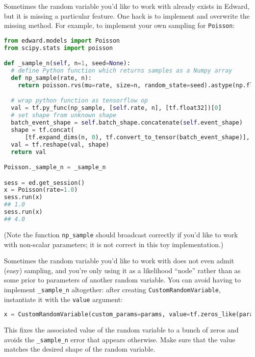 Sometimes the random variable you'd like to work with already exists
in Edward, but it is missing a particular feature. One hack is to
implement and overwrite the missing method. For example, to implement
your own sampling for \texttt{Poisson}:

\begin{lstlisting}[language=Python]
from edward.models import Poisson
from scipy.stats import poisson

def _sample_n(self, n=1, seed=None):
  # define Python function which returns samples as a Numpy array
  def np_sample(rate, n):
    return poisson.rvs(mu=rate, size=n, random_state=seed).astype(np.float32)

  # wrap python function as tensorflow op
  val = tf.py_func(np_sample, [self.rate, n], [tf.float32])[0]
  # set shape from unknown shape
  batch_event_shape = self.batch_shape.concatenate(self.event_shape)
  shape = tf.concat(
      [tf.expand_dims(n, 0), tf.convert_to_tensor(batch_event_shape)], 0)
  val = tf.reshape(val, shape)
  return val

Poisson._sample_n = _sample_n

sess = ed.get_session()
x = Poisson(rate=1.0)
sess.run(x)
## 1.0
sess.run(x)
## 4.0
\end{lstlisting}

(Note the function \texttt{np_sample} should broadcast correctly if
you'd like to work with non-scalar parameters; it is not correct in
this toy implementation.)

Sometimes the random variable you'd like to work with does not even
admit (easy) sampling, and you're only using it as a likelihood ``node'' rather
than as some prior to parameters of another random variable.
You can avoid having to implement \texttt{_sample_n} altogether:
after creating \texttt{CustomRandomVariable}, instantiate it with the
\texttt{value} argument:

\begin{lstlisting}[language=Python]
x = CustomRandomVariable(custom_params=params, value=tf.zeros_like(params))
\end{lstlisting}

This fixes the associated value of the random variable to a bunch of
zeros and avoids the \texttt{_sample_n} error that appears otherwise.
Make sure that the value matches the desired shape of the random
variable.
